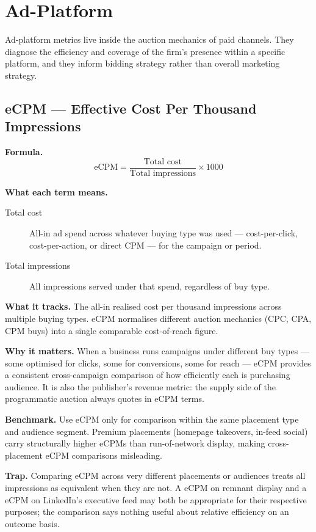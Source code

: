 \section{Ad-Platform}

Ad-platform metrics live inside the auction mechanics of paid channels. They diagnose
the efficiency and coverage of the firm's presence within a specific platform, and they
inform bidding strategy rather than overall marketing strategy.

\subsection{eCPM --- Effective Cost Per Thousand Impressions}

\textbf{Formula.}
\[
  \mathrm{eCPM} = \frac{\text{Total cost}}{\text{Total impressions}} \times 1000
\]

\textbf{What each term means.}
\begin{description}
  \item[Total cost] All-in ad spend across whatever buying type was used --- cost-per-click,
    cost-per-action, or direct CPM --- for the campaign or period.
  \item[Total impressions] All impressions served under that spend, regardless of buy type.
\end{description}

\textbf{What it tracks.} The all-in realised cost per thousand impressions across multiple
buying types. eCPM normalises different auction mechanics (CPC, CPA, CPM buys) into a
single comparable cost-of-reach figure.

\textbf{Why it matters.} When a business runs campaigns under different buy types --- some
optimised for clicks, some for conversions, some for reach --- eCPM provides a consistent
cross-campaign comparison of how efficiently each is purchasing audience. It is also the
publisher's revenue metric: the supply side of the programmatic auction always quotes in eCPM
terms.

\textbf{Benchmark.} Use eCPM only for comparison within the same placement type and
audience segment. Premium placements (homepage takeovers, in-feed social) carry
structurally higher eCPMs than run-of-network display, making cross-placement eCPM
comparisons misleading.

\textbf{Trap.} Comparing eCPM across very different placements or audiences treats all
impressions as equivalent when they are not. A  eCPM on remnant display and a
 eCPM on LinkedIn's executive feed may both be appropriate for their respective
purposes; the comparison says nothing useful about relative efficiency on an outcome basis.

